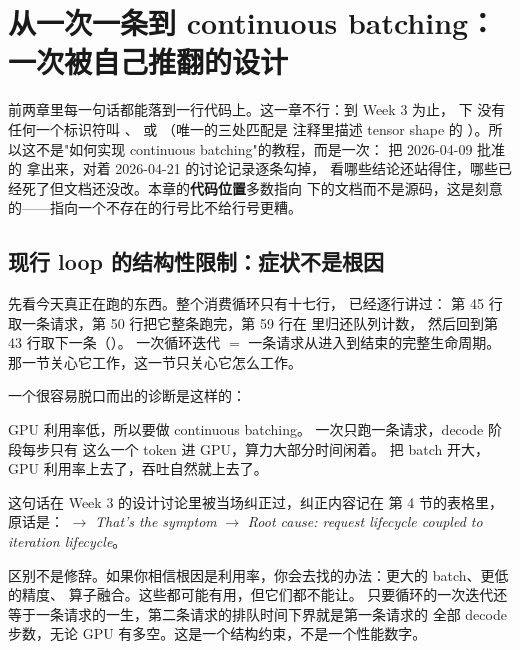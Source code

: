 \section{从一次一条到 continuous batching：一次被自己推翻的设计}
\label{sec:a-batching}

前两章里每一句话都能落到一行代码上。这一章不行：到 Week 3 为止， 下
没有任何一个标识符叫 、 或 
（唯一的三处匹配是  注释里描述 tensor shape 的
）。所以这不是"如何实现 continuous batching"的教程，而是一次：
把 2026-04-09 批准的  拿出来，对着 2026-04-21 的讨论记录逐条勾掉，
看哪些结论还站得住，哪些已经死了但文档还没改。本章的\textbf{代码位置}多数指向 
下的文档而不是源码，这是刻意的——指向一个不存在的行号比不给行号更糟。

\subsection{现行 loop 的结构性限制：症状不是根因}
\label{sec:cb-limit}

先看今天真正在跑的东西。整个消费循环只有十七行， 已经逐行讲过：
第 45 行取一条请求，第 50 行把它整条跑完，第 59 行在  里归还队列计数，
然后回到第 43 行取下一条（）。
一次循环迭代 $=$ 一条请求从进入到结束的完整生命周期。
那一节关心它工作，这一节只关心它怎么工作。

一个很容易脱口而出的诊断是这样的：

\begin{misconception}{GPU 利用率低，所以要做 continuous batching。}
一次只跑一条请求，decode 阶段每步只有 \code{[1, 1]} 这么一个 token 进 GPU，算力大部分时间闲着。
把 batch 开大，GPU 利用率上去了，吞吐自然就上去了。
\end{misconception}

这句话在 Week 3 的设计讨论里被当场纠正过，纠正内容记在
 第 4 节的表格里，原话是：
$\to$ \emph{That's the symptom} $\to$ \emph{Root cause: request lifecycle coupled to iteration lifecycle}。

区别不是修辞。如果你相信根因是利用率，你会去找的办法：更大的 batch、更低的精度、
算子融合。这些都可能有用，但它们都不能让。
只要循环的一次迭代还等于一条请求的一生，第二条请求的排队时间下界就是第一条请求的
全部 decode 步数，无论 GPU 有多空。这是一个结构约束，不是一个性能数字。

